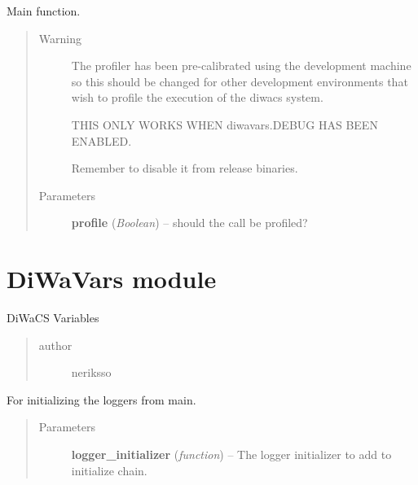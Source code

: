 \documentclass[letterpaper,10pt,english]{sphinxmanual}
\begin{document}

\begin{fulllineitems}
\label{diwacs:diwacs.main}
Main function.
\begin{quote}\begin{description}
\item[{Warning }] \leavevmode
The profiler has been pre-calibrated using the development machine
so this should be changed for other development environments that
wish to profile the execution of the diwacs system.

THIS ONLY WORKS WHEN diwavars.DEBUG HAS BEEN ENABLED.

Remember to disable it from release binaries.

\item[{Parameters}] \leavevmode
\textbf{profile} (\emph{Boolean}) -- should the call be profiled?

\end{description}\end{quote}

\end{fulllineitems}



\section{DiWaVars module}
\label{diwavars:module-diwavars}\label{diwavars:diwavars-module}\label{diwavars::doc}
DiWaCS Variables
\begin{quote}\begin{description}
\item[{author}] \leavevmode
neriksso

\end{description}\end{quote}

\begin{fulllineitems}
\label{diwavars:diwavars.add_logger_initializer}
For initializing the loggers from main.
\begin{quote}\begin{description}
\item[{Parameters}] \leavevmode
\textbf{logger\_initializer} (\emph{function}) -- The logger initializer to add to initialize chain.

\end{description}\end{quote}

\end{fulllineitems}
\end{document}
